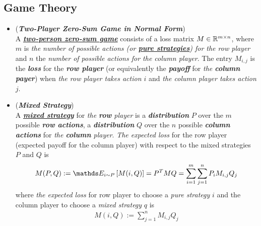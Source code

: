 \documentclass[11pt]{article}
\begin{document}
\subsection{Game Theory}
\begin{itemize}
\item \begin{definition}(\textbf{\emph{Two-Player Zero-Sum Game in Normal Form}})  \citep{schapire2012boosting, mohri2018foundations} \\
A \underline{\emph{\textbf{two-person zero-sum game}}} consists of a loss matrix $M \in {\mathbb R}^{m\times n}$, where $m$ is\emph{ the number of possible actions (or \underline{\textbf{pure strategies}}) for the row player} and $n$ the \emph{number of possible actions for the column player}. The entry $M_{i,j}$ is the \emph{\textbf{loss}} for the \emph{\textbf{row player}} (or equivalently the \emph{\textbf{payoff}} for \emph{the \textbf{column payer}}) when \emph{the row player takes action $i$} and \emph{the column player takes action $j$}.
\end{definition}

\item \begin{definition}(\textbf{\emph{Mixed Strategy}}) \citep{schapire2012boosting, mohri2018foundations} \\
A \underline{\emph{\textbf{mixed strategy}}} for \emph{the \textbf{row} player} is a \emph{\textbf{distribution}} $P$ over the $m$ possible \emph{\textbf{row actions}}, a \emph{\textbf{distribution}} $Q$ over the $n$ possible \emph{\textbf{column actions}} for \emph{the \textbf{column} player}.
\emph{The expected loss} for the row player (expected payoff for the column player) with respect to the mixed strategies $P$ and $Q$ is
\begin{align}
M(P, Q) := \E{i \sim P}{M(i, Q) } = P^T M Q = \sum_{i = 1}^{m}\sum_{j=1}^{n}P_{i}M_{i,j}Q_{j} \label{def: mixed_strategy}
\end{align} where \emph{the expected loss} for row player to choose a \emph{pure strategy} $i$ and the column player to choose a \emph{mixed strategy} $q$ is
\begin{align*}
M(i, Q) := \sum_{j=1}^{n}M_{i,j}Q_{j}
\end{align*}
\end{definition}


\end{itemize}
\end{document}
